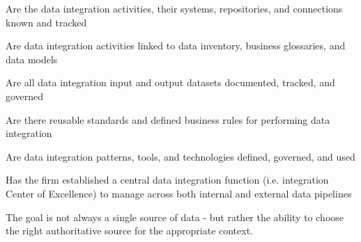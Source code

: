 %
%



\begin{maturity-dimensions}

  \item Are the data integration activities, their systems, repositories, and connections
        known and tracked
  \item Are data integration activities linked to data inventory, business glossaries, and data models
  \item Are all data integration input and output datasets documented, tracked, and governed
  \item Are there reusable standards and defined business rules for performing data integration
  \item Are data integration patterns, tools, and technologies defined, governed, and used
  \item Has the firm established a central data integration function
        (i.e. integration Center of Excellence) to manage  across both
        internal and external data pipelines
\end{maturity-dimensions}

The goal is not always a single source of data - but rather the ability to choose the right authoritative source
for the appropriate context.

\ekgmmCapabilitySectionLevelsOneFive

